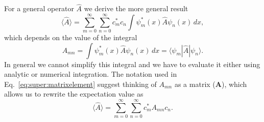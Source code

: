 \documentclass[../Main/chem331-notes.tex]{subfiles}
\begin{document}
For a general operator $\hat{A}$ we derive the more general result
\begin{equation}
\langle \hat{A} \rangle = \sum_{m = 0}^\infty \sum_{n = 0}^\infty   c^*_m c_n \int \psi^*_m(x) \hat{A} \psi_n(x) \, dx,
\end{equation}
which depends on the value of the integral
\begin{equation}
\label{eq:super:matrixelement}
A_{mn} = \int \psi^*_m(x) \hat{A} \psi_n(x) \, dx = \langle{\psi_m}|\hat{A}|{\psi_n}\rangle.
\end{equation}
In general we cannot simplify this integral and we have to evaluate it either using analytic or numerical integration.
The notation used in Eq.~\eqref{eq:super:matrixelement} suggest thinking of $A_{mn}$ as a matrix ($\mathbf{A}$), which allows us to rewrite the expectation value as
\begin{equation}
\langle \hat{A} \rangle = \sum_{m = 0}^\infty \sum_{n = 0}^\infty   c^*_m A_{mn} c_n.
\end{equation}
\end{document}
